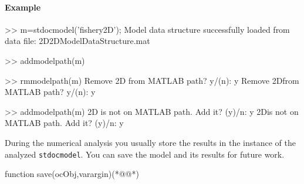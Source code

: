 \paragraph{Example}
\begin{matlab}
>> m=stdocmodel('fishery2D');
Model data structure successfully loaded from data file:
\ocmat\model\usermodel\fishery2D\data\fishery2DModelDataStructure.mat

>> addmodelpath(m)

>> rmmodelpath(m)
Remove \ocmat\model\usermodel\fishery2D from MATLAB path?  y/(n): y
Remove \ocmat\model\usermodel\fishery2D\data from MATLAB path?  y/(n): y

>> addmodelpath(m)
\ocmat\model\usermodel\fishery2D is not on MATLAB path. Add it?  (y)/n: y
\ocmat\model\usermodel\fishery2D\data is not on MATLAB path. Add it?  (y)/n: y
\end{matlab}
During the numerical analysis you usually store the results in the instance of the analyzed \lstinline+stdocmodel+. You can save the model and its results for future work.
\begin{matlab}
function save(ocObj,varargin)(*@\label{cmd:save}@*)
%
%
%
%
%
%
%
\end{matlab}
